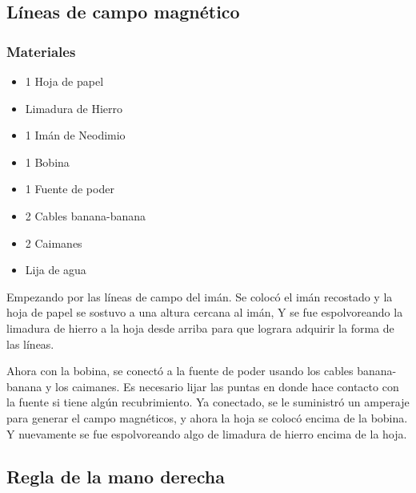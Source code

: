\documentclass[article,12pt]{elsarticle}
\begin{document}
    \subsection{Líneas de campo magnético}
        \subsubsection{Materiales}
        \begin{itemize}
            \item 1 Hoja de papel
            \item Limadura de Hierro
            \item 1 Imán de Neodimio
            \item 1 Bobina
            \item 1 Fuente de poder
            \item 2 Cables banana-banana
            \item 2 Caimanes
            \item Lija de agua
        \end{itemize}
        Empezando por las líneas de campo del imán. Se colocó el imán recostado y la hoja de papel se sostuvo a una altura cercana al imán, Y se fue espolvoreando la limadura de hierro a la hoja desde arriba para que lograra adquirir la forma de las líneas.

        Ahora con la bobina, se conectó a la fuente de poder usando los cables banana-banana y los caimanes. Es necesario lijar las puntas en donde hace contacto con la fuente si tiene algún recubrimiento.
        Ya conectado, se le suministró un amperaje para generar el campo magnéticos, y ahora la hoja se colocó encima de la bobina. Y nuevamente se fue espolvoreando algo de limadura de hierro encima de la hoja.
    \subsection{Regla de la mano derecha}
\end{document}
